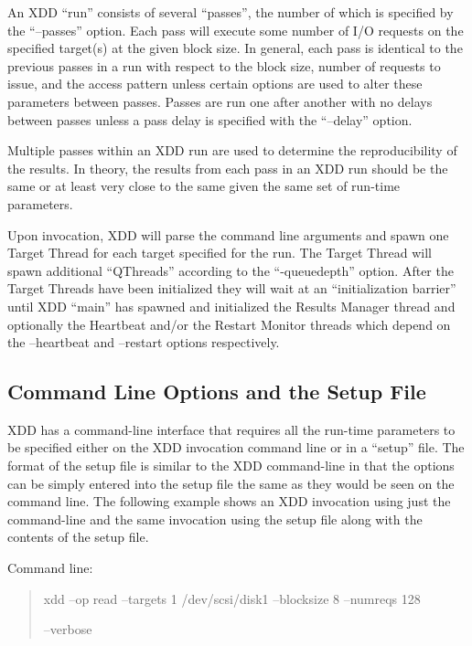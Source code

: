 An XDD ``run'' consists of several ``passes'', the number of which is specified by the ``--passes'' option. Each pass will execute some number of I/O requests on the specified target(s) at the given block size. In general, each pass is identical to the previous passes in a run with respect to the block size, number of requests to issue, and the access pattern unless certain options are used to alter these parameters between passes. Passes are run one after another with no delays between passes unless a pass delay is specified with the ``--delay'' option.

Multiple passes within an XDD run are used to determine the reproducibility of the results. In theory, the results from each pass in an XDD run should be the same or at least very close to the same given the same set of run-time parameters.

Upon invocation, XDD will parse the command line arguments and spawn one Target Thread for each target specified for the run. The Target Thread will spawn additional ``QThreads'' according to the ``-queuedepth'' option. After the Target Threads have been initialized they will wait at an ``initialization barrier'' until XDD ``main'' has spawned and initialized the Results Manager thread and optionally the Heartbeat and/or the Restart Monitor threads which depend on the --heartbeat and --restart options respectively.

\subsection{Command Line Options and the Setup File}\label{command-line-options-and-the-setup-file}

XDD has a command-line interface that requires all the run-time parameters to be specified either on the XDD invocation command line or in a ``setup'' file. The format of the setup file is similar to the XDD command-line in that the options can be simply entered into the setup file the same as they would be seen on the command line. The following example shows an XDD invocation using just the command-line and the same invocation using the setup file along with the contents of the setup file.

Command line:

\begin{quote}
xdd --op read --targets 1 /dev/scsi/disk1 --blocksize 8 --numreqs 128

--verbose
\end{quote}

